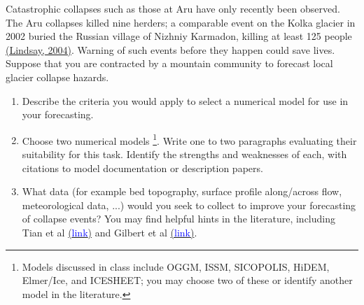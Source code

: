 \documentclass[12pt]{article}
\newenvironment{problem}[2][Problem]{\begin{trivlist}
\item[\hskip \labelsep {\bfseries #1}\hskip \labelsep {\bfseries #2.}]}{\end{trivlist}}
\begin{document}
\begin{problem}{3}
 [8 points]
 Catastrophic collapses such as those at Aru have only recently been observed.
 The Aru collapses killed nine herders; a comparable event on the Kolka glacier in 2002 buried the Russian village of Nizhniy Karmadon, killing at least 125 people \href{https://earthobservatory.nasa.gov/features/Kolka}{(Lindsay, 2004)}. 
 Warning of such events before they happen could save lives.
 Suppose that you are contracted by a mountain community to forecast local glacier collapse hazards.  
\renewcommand{\labelenumi}{(\alph{enumi})}
\begin{enumerate}[itemsep=2pt]
   \item Describe the criteria you would apply to select a numerical model for use in your forecasting.
   \item Choose two numerical models%
   \footnote{Models discussed in class include OGGM, ISSM, SICOPOLIS, HiDEM, Elmer/Ice, and ICESHEET; you may choose two of these or identify another model in the literature.}. 
   Write one to two paragraphs evaluating their suitability for this task. Identify the strengths and weaknesses of each, with citations to model documentation or  description papers.
   \item What data (for example bed topography, surface profile along/across flow, meteorological data, ...) would you seek to collect to improve your forecasting of collapse events?  You may find helpful hints in the literature, including Tian et al \href{https://www.cambridge.org/core/journals/journal-of-glaciology/article/two-glaciers-collapse-in-western-tibet/881D7526DCBCB83E45728829F13F802E}{(\textcolor{blue}{link})} and Gilbert et al \href{https://tc.copernicus.org/articles/12/2883/2018/}{(\textcolor{blue}{link})}.
  
\end{enumerate}

\end{problem}
\end{document}
